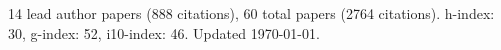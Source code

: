 14 lead author papers (888 citations),
60 total papers (2764 citations).\newline
h-index: 30, g-index: 52, i10-index: 46. Updated \today.
